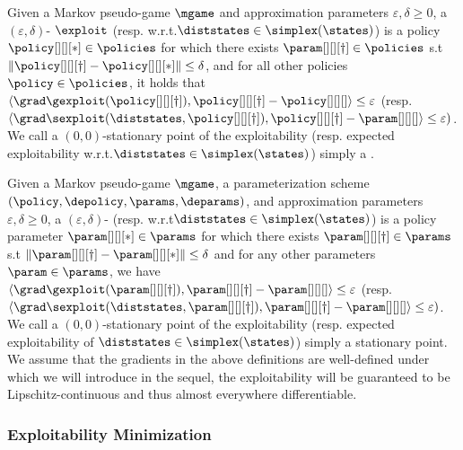 Given a Markov pseudo-game $\mgame$ and approximation parameters $\varepsilon, \delta \geq 0$, a $(\varepsilon, \delta)$- $\exploit$ (resp.  w.r.t.\@ $\diststates \in \simplex(\states)$) is a policy $\policy[][][*] \in \policies$ for which there exists $\param[][][\dagger] \in \policies$ s.t $\| \policy[][][\dagger] - \policy[][][*]\| \leq \delta$, and for all other policies $\policy \in \policies$, it holds that $\langle \grad \gexploit (\policy[][][\dagger]), \policy[][][\dagger] - \policy[][][] \rangle \leq \varepsilon$ (resp. $\langle \grad \sexploit (\diststates, \policy[][][\dagger]), \policy[][][\dagger] - \param[][][] \rangle \leq \varepsilon)$. 
We call a $(0, 0)$-stationary point of the exploitability (resp. expected exploitability w.r.t.\@ $\diststates \in \simplex(\states)$) simply a .
\fi

Given a Markov pseudo-game $\mgame$, a parameterization scheme $(\policy, \depolicy, \params, \deparams)$, and approximation parameters $\varepsilon, \delta \geq 0$, a $(\varepsilon, \delta)$- (resp.  w.r.t\@ $\diststates \in \simplex(\states)$) is a policy parameter $\param[][][*] \in \params$ for which there exists $\param[][][\dagger] \in \params$ s.t $\| \param[][][\dagger] - \param[][][*]\| \leq \delta$ and for any other parameters $\param \in \params$, we have $\langle \grad \gexploit(\param[][][\dagger]), \param[][][\dagger] - \param[][][] \rangle \leq \varepsilon$ (resp. $\langle \grad \sexploit(\diststates, \param[][][\dagger]), \param[][][\dagger] - \param[][][] \rangle \leq \varepsilon)$. We call a $(0, 0)$-stationary point of the exploitability (resp. expected exploitability of $\diststates \in \simplex(\states)$) simply a stationary point. We assume that the gradients in the above definitions are well-defined under  which we will introduce in the sequel, the exploitability will be guaranteed to be Lipschitz-continuous and thus almost everywhere differentiable.
\fi


\subsubsection{Exploitability Minimization}

